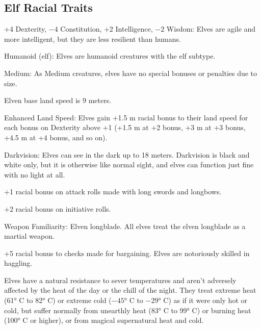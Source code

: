\subsection{Elf Racial Traits}
\begin{itemize*}
    \item +4 Dexterity, $-4$ Constitution, +2 Intelligence, $-2$ Wisdom: Elves are agile and more intelligent, but they are less resilient than humans.
    \item Humanoid (elf): Elves are humanoid creatures with the elf subtype.
    \item Medium: As Medium creatures, elves have no special bonuses or penalties due to size.
    \item Elven base land speed is 9 meters.
    \item Enhanced Land Speed: Elves gain +1.5 m racial bonus to their land speed for each bonus on Dexterity above +1 (+1.5 m at +2 bonus, +3 m at +3 bonus, +4.5 m at +4 bonus, and so on).
    \item Darkvision: Elves can see in the dark up to 18 meters. Darkvision is black and white only, but it is otherwise like normal sight, and elves can function just fine with no light at all.
    \item +1 racial bonus on attack rolls made with long swords and longbows.
    \item +2 racial bonus on initiative rolls.
    \item Weapon Familiarity: Elven longblade. All elves treat the elven longblade as a martial weapon.
    \item +5 racial bonus to  checks made for bargaining. Elves are notoriously skilled in haggling.
    \item Elves have a natural resistance to sever temperatures and aren't adversely affected by the heat of the day or the chill of the night. They treat extreme heat (61° C to 82° C) or extreme cold ($-45$° C to $-29$° C) as if it were only hot or cold, but suffer normally from unearthly heat (83° C to 99° C) or burning heat (100° C or higher), or from magical supernatural heat and cold.

\end{itemize*}
